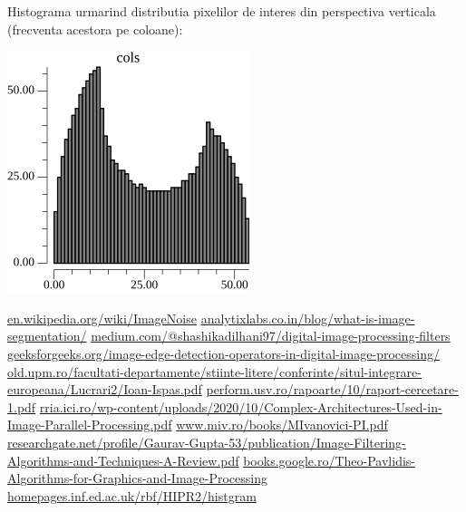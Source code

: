 \documentclass[10pt]{article}
\begin{document}
\> Histograma urmarind distributia pixelilor de interes din perspectiva verticala (frecventa acestora pe coloane):

\begin{center}

  \includegraphics[scale=0.5]{hist-cols}
  
\end{center}

\newpage

\begin{thebibliography}{widest entry}
   \href{https://en.wikipedia.org/wiki/Image_noise}{en.wikipedia.org/wiki/ImageNoise}
   \href{https://www.analytixlabs.co.in/blog/what-is-image-segmentation/}{analytixlabs.co.in/blog/what-is-image-segmentation/}
   \href{https://medium.com/@shashikadilhani97/digital-image-processing-filters-832ec6d18a73}{medium.com/@shashikadilhani97/digital-image-processing-filters}
   \href{https://www.geeksforgeeks.org/image-edge-detection-operators-in-digital-image-processing/}{geeksforgeeks.org/image-edge-detection-operators-in-digital-image-processing/}
   \href{http://old.upm.ro/facultati_departamente/stiinte_litere/conferinte/situl_integrare_europeana/Lucrari2/Ioan_Ispas.pdf}{old.upm.ro/facultati-departamente/stiinte-litere/conferinte/situl-integrare-europeana/Lucrari2/Ioan-Ispas.pdf}
   \href{http://www.perform.usv.ro/rapoarte/10/raport_cercetare_1.pdf}{perform.usv.ro/rapoarte/10/raport-cercetare-1.pdf}
   \href{https://rria.ici.ro/wp-content/uploads/2020/10/Complex_Architectures_Used_in_Image_Parallel_Processing.pdf}{rria.ici.ro/wp-content/uploads/2020/10/Complex-Architectures-Used-in-Image-Parallel-Processing.pdf}
   \href{https://www.miv.ro/books/MIvanovici_PI.pdf}{www.miv.ro/books/MIvanovici-PI.pdf}
   \href{https://www.researchgate.net/profile/Gaurav-Gupta-53/publication/325681876_Image_Filtering_Algorithms_and_Techniques_A_Review/links/5b1e1ab0aca272021cf585c9/Image-Filtering-Algorithms-and-Techniques-A-Review.pdf}{researchgate.net/profile/Gaurav-Gupta-53/publication/Image-Filtering-Algorithms-and-Techniques-A-Review.pdf}
   \href{https://books.google.ro/books?id=xeWpCAAAQBAJ&printsec=frontcover&redir_esc=y#v=onepage&q&f=false}{books.google.ro/Theo-Pavlidis-Algorithms-for-Graphics-and-Image-Processing}
   \href{https://homepages.inf.ed.ac.uk/rbf/HIPR2/histgram.htm}{homepages.inf.ed.ac.uk/rbf/HIPR2/histgram}
\end{thebibliography} 
\end{document}
